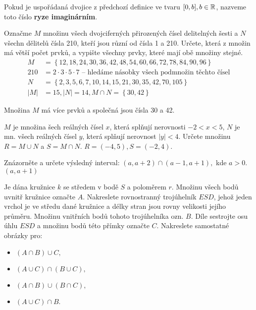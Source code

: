 \begin{definition}
  Pokud je uspořádaná dvojice z předchozí definice ve tvaru $[0, b], b \in \mathbb{R}$, nazveme toto číslo \textbf{ryze imaginárním}.
\end{definition}

\begin{example}[SÚM 169/8]
  Označme $M$ množinu všech dvojciferných přirozených čísel delitelných šesti a $N$ všechn dělitelů čísla 210, kteří jsou různí od čísla 1 a 210. Určete, která z množin má větší počet prvků, a vypište všechny prvky, které mají obě množiny stejné.
  \begin{align*}
    M & = \left\{12, 18, 24, 30, 36, 42, 48, 54, 60, 66, 72, 78, 84, 90, 96\right\}\\
    210 & = 2\cdot 3 \cdot 5  \cdot 7 \textrm{ -- hledáme násobky všech podmnožin těchto čísel} \\
    N  & = \left\{2,3,5,6,7, 10, 14, 15, 21, 30, 35, 42, 70, 105\right\} \\
    |M| & = 15, |N| = 14, M \cap N = \left\{30, 42\right\}
  \end{align*}

  \rm Množina $M$ má více prvků a společná jsou čísla 30 a 42.
\end{example}

\begin{example}[SÚM 171/26]
  $M$ je množina šech reálných čísel $x$, která splňují nerovnosti $-2<x<5$, $N$ je mn. všech reálných čísel $y$, která splňují nerovnost $|y|<4$. Určete množinu $R=M\cup N$ a $S = M\cap N.$ \hfill $R = (-4,5), S=(-2,4).$
\end{example}

\begin{example}[SÚM 172/29f]
  Znázorněte a určete výsledný interval: $(a,a+2)\cap (a-1,a+1),$ kde $a>0.$\hfill$(a,a+1)$
\end{example}

\begin{example}[SÚM (172/33)]
  Je dána kružnice $k$ se středem v bodě  $S$ a poloměrem $r$. Množinu všech bodů uvnitř kružnice označte $A$. Nakreslete rovnostranný trojúhelník $ESD$, jehož jeden vrchol je ve středu dané kružnice a délky stran jsou rovny velikosti jejího průměru. Množinu vnitřních bodů tohoto trojúhelníka ozn. $B$. Díle sestrojte osu úhlu $ESD$ a množinu bodů této přímky označte $C$. Nakreslete samostatné obrázky pro:
  \begin{itemize}
    \item $(A\cap B)\cup C,$
    \item $(A\cup C) \cap (B\cup C),$
    \item $(A\cap B) \cup (B\cap C),$
    \item $(A\cup C) \cap B$.
  \end{itemize}
\end{example}

